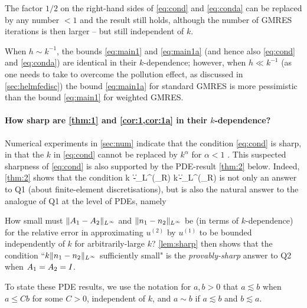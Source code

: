 The factor $1/2$ on the right-hand sides of \cref{eq:cond} and \cref{eq:conda} can be replaced by any number $<1$ and the result still holds, although the number of GMRES iterations is then larger -- but still independent of $k$.

\bre
When $h\sim  k^{-1}$, the bounds \cref{eq:main1} and \cref{eq:main1a} (and hence also \cref{eq:cond} and \cref{eq:conda}) are identical in their $k$-dependence; however, when $h\ll k^{-1}$ (as one needs to take to overcome the pollution effect, as discussed in \cref{sec:helmfedisc}) the bound \cref{eq:main1a} for standard GMRES is more pessimistic than the bound \cref{eq:main1} for weighted GMRES.
\ere


\paragraph{How sharp are \cref{thm:1} and \cref{cor:1,cor:1a} in their $k$-dependence?}
Numerical experiments in \cref{sec:num} indicate that the condition \cref{eq:cond} is sharp, in that the $k$ in \cref{eq:cond} cannot be replaced by $k^\alpha$ for $\alpha<1$ . This suspected sharpness of \cref{eq:cond} is also supported by the PDE-result \cref{thm:2} below. Indeed, \cref{thm:2} %
 shows that the condition
\beqs
k\,
\big\|\Ao-\At\big\|_{L^\infty(\Omega_R)} \quad{} \quad k\,\big\|\no-\nt\big\|_{L^\infty(\Omega_R)}
\quad{}
\eeqs
is not only an answer to Q1 (about finite-element discretisations), but is also the natural answer to the analogue of Q1 at the level of PDEs, namely 
\bit
\item[Q2.]
How small must $\|A_{1} - A_{2}\|_{L^\infty}$ and 
$\|n_{1} - n_{2}\|_{L^\infty}$ be (in terms of $k$-dependence) for the relative error in approximating 
$u^{(2)}$ by $u^{(1)}$ to be bounded independently of $k$ for arbitrarily-large $k$? 
\eit
\cref{lem:sharp} then shows that the condition ``$k\|n_{1} - n_{2}\|_{L^\infty}$ sufficiently small" is the \emph{provably-sharp} answer to Q2 when $A_{1}= A_{2}= I$.

To state these PDE results, we use the notation for $a,b>0$ that $a\lesssim b$ when $a\leq C b$ for some $C>0$, independent of $k$, and $a\sim b$ if $a\lesssim b$ and $b\lesssim a$.


